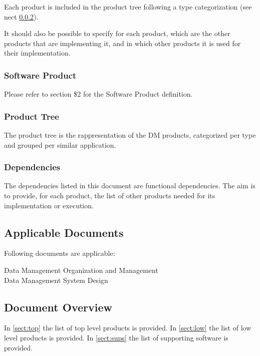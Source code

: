 Each product is included in the product tree following a type categorization (see nect \ref{sec:ptree}).

It should also be possible to specify for each product, which are the other products that are implementing it, and in which other products it is used for their implementation.


\subsubsection{Software Product} \label{sec:swproduct}

Please refer to  section \$2 for the Software Product definition.


\subsubsection{Product Tree} \label{sec:ptree}

The product tree is the rappresentation of the DM products, categorized per type and grouped per similar application.


\subsubsection{Dependencies} \label{sec:dependencies}

The dependencies listed in this document are functional dependencies.
The aim is to provide, for each product, the list of other products needed for its implementation or execution. 


\subsection{Applicable Documents}

Following documents are applicable:

 Data Management Organization and Management\\
 Data Management System Design

\subsection{Document Overview}

In \ref{sect:top} the list of top level products is provided.
In \ref{sect:low} the list of low level products is provided.
In \ref{sect:sups} the list of supporting software is provided.


\newpage

